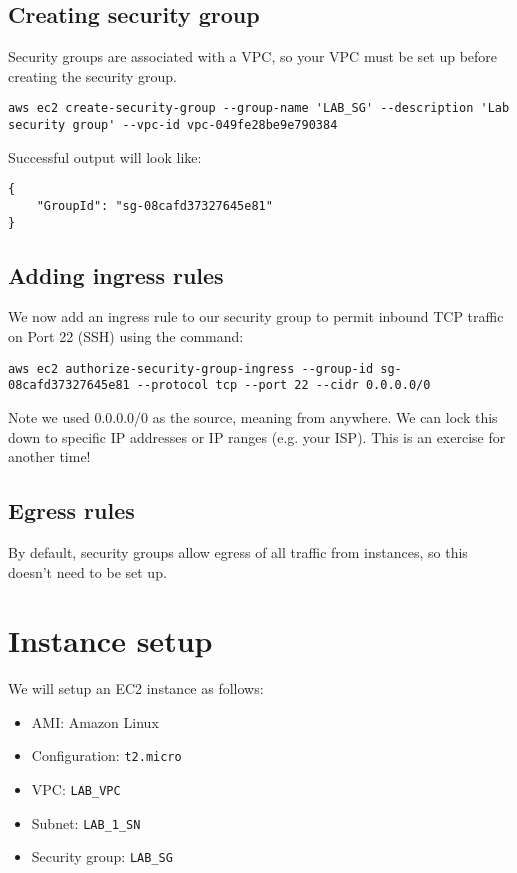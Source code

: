 \documentclass{pgnotes}
\begin{document}
\subsection{Creating security group}
\label{sec:creating-security-group}

Security groups are associated with a VPC, so your VPC must be set up before creating the security group. 
\begin{verbatim}
aws ec2 create-security-group --group-name 'LAB_SG' --description 'Lab security group' --vpc-id vpc-049fe28be9e790384
\end{verbatim}
Successful output will look like:
\begin{verbatim}
{
    "GroupId": "sg-08cafd37327645e81"
}
\end{verbatim}

\subsection{Adding ingress rules}

We now add an ingress rule to our security group to permit inbound TCP traffic on Port 22 (SSH) using the command: 

\begin{verbatim}
aws ec2 authorize-security-group-ingress --group-id sg-08cafd37327645e81 --protocol tcp --port 22 --cidr 0.0.0.0/0
\end{verbatim}

Note we used 0.0.0.0/0 as the source, meaning from anywhere.
We can lock this down to specific IP addresses or IP ranges (e.g. your ISP).
This is an exercise for another time!

\subsection{Egress rules}

By default, security groups allow egress of all traffic from instances, so this doesn't need to be set up. 


\section{Instance setup}

We will setup an EC2 instance as follows:

\begin{itemize}
\item AMI: Amazon Linux
\item Configuration: \texttt{t2.micro} 
\item VPC: \texttt{LAB\_VPC}
\item Subnet: \texttt{LAB\_1\_SN}
\item Security group: \texttt{LAB\_SG}
\end{itemize}
\end{document}
